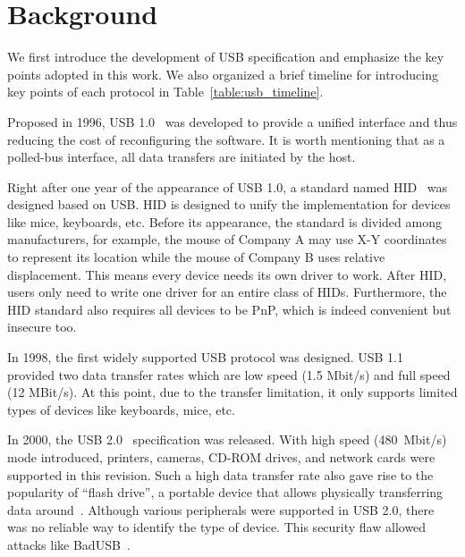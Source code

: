 \section{Background}
\label{sec:background}

We first introduce the development of \ac{USB} specification and emphasize the key
points adopted in this work. We also organized a brief timeline for introducing
key points of each protocol in Table~\ref{table:usb_timeline}.

Proposed in 1996, \ac{USB} 1.0~\cite{usb10} was developed to provide a unified
interface and thus reducing the cost of reconfiguring the software. It is
worth mentioning that as a polled-bus interface, all data transfers are
initiated by the host.

Right after one year of the appearance of \ac{USB} 1.0, a standard named \acf{HID}~\cite{hid} was designed based on \ac{USB}. \ac{HID} is
designed to unify the implementation for devices like mice,
keyboards, etc. Before its appearance, the standard is divided among
manufacturers, for example, the mouse of Company A may use X-Y coordinates to
represent its location while the mouse of Company B uses relative displacement.
This means every device needs its own driver to work. After \ac{HID}, users only need to
write one driver for an entire class of \acp{HID}. Furthermore, the \ac{HID} standard also
requires all devices to be \ac{PnP}, which is indeed
convenient but insecure too.

In 1998, the first widely supported \ac{USB} protocol was designed. \ac{USB} 1.1~\cite{usb11}
provided two data transfer rates which are low speed (1.5 Mbit/s) and full
speed (12 MBit/s). At this point, due to the transfer limitation, it only supports
limited types of devices like keyboards, mice, etc.

In 2000, the \ac{USB} 2.0~\cite{usb20} specification was released. With high speed \mbox{(480
Mbit/s)} mode introduced, printers, cameras, CD-ROM drives, and network cards were
supported in this revision. Such a high data transfer rate also gave rise to the
popularity of ``flash drive'', a portable device that allows physically
transferring data around~\cite{sok}. Although various peripherals were supported
in \ac{USB} 2.0, there was no reliable way to identify the type of device. This
security flaw allowed attacks like BadUSB~\cite{badusb,rubber}.

